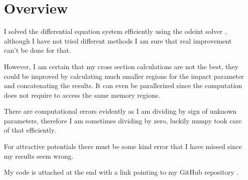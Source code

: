 \documentclass[a4paper,12pt]{article}
\begin{document}
\section{ Overview}

\par I solved the differential equation system efficiently using the
odeint solver \cite{odeint}, although I have not tried different methods I am sure
that real improvement can't be done for that.

\par However, I am certain that my cross section calculations are not the
best, they could be improved by calculating much smaller regions for the impact
parameter and concatenating the results. It can even be parallerized since
the computation does not require to access the same memory regions.

\par There are computational errors evidently as I am dividing by sign
of unknown parameters, therefore I am sometimes dividing by zero, luckily
numpy took care of that efficiently.

\par For attractive potentials there must be some kind error that I
have missed since my results seem wrong.

\par My code is attached at the end with a link pointing to my GitHub
repository \cite{repo}.



\end{document}
